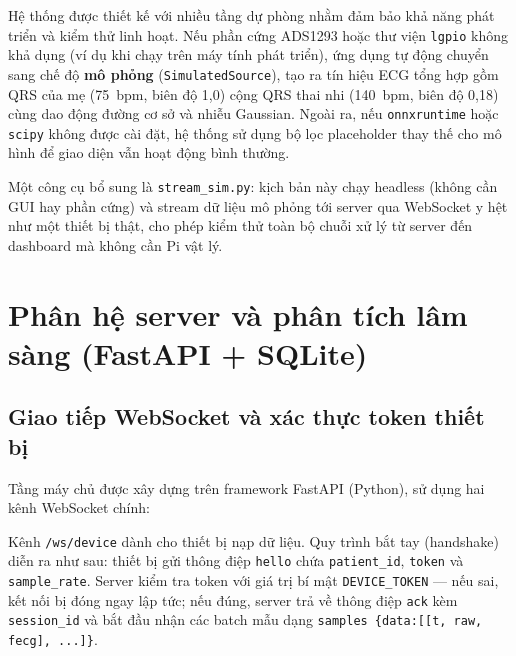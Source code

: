 \documentclass[../DoAn.tex]{subfiles}
\begin{document}
Hệ thống được thiết kế với nhiều tầng dự phòng nhằm đảm bảo khả năng phát triển và kiểm thử linh hoạt. Nếu phần cứng ADS1293 hoặc thư viện \texttt{lgpio} không khả dụng (ví dụ khi chạy trên máy tính phát triển), ứng dụng tự động chuyển sang chế độ \textbf{mô phỏng} (\texttt{SimulatedSource}), tạo ra tín hiệu ECG tổng hợp gồm QRS của mẹ (75~bpm, biên độ 1{,}0) cộng QRS thai nhi (140~bpm, biên độ 0{,}18) cùng dao động đường cơ sở và nhiễu Gaussian. Ngoài ra, nếu \texttt{onnxruntime} hoặc \texttt{scipy} không được cài đặt, hệ thống sử dụng bộ lọc placeholder thay thế cho mô hình để giao diện vẫn hoạt động bình thường.

Một công cụ bổ sung là \texttt{stream\_sim.py}: kịch bản này chạy headless (không cần GUI hay phần cứng) và stream dữ liệu mô phỏng tới server qua WebSocket y hệt như một thiết bị thật, cho phép kiểm thử toàn bộ chuỗi xử lý từ server đến dashboard mà không cần Pi vật lý.

\section{Phân hệ server và phân tích lâm sàng (FastAPI + SQLite)}

\subsection{Giao tiếp WebSocket và xác thực token thiết bị}

Tầng máy chủ được xây dựng trên framework FastAPI (Python), sử dụng hai kênh WebSocket chính:

Kênh \texttt{/ws/device} dành cho thiết bị nạp dữ liệu. Quy trình bắt tay (handshake) diễn ra như sau: thiết bị gửi thông điệp \texttt{hello} chứa \texttt{patient\_id}, \texttt{token} và \texttt{sample\_rate}. Server kiểm tra token với giá trị bí mật \texttt{DEVICE\_TOKEN} --- nếu sai, kết nối bị đóng ngay lập tức; nếu đúng, server trả về thông điệp \texttt{ack} kèm \texttt{session\_id} và bắt đầu nhận các batch mẫu dạng \texttt{samples \{data:[[t, raw, fecg], ...]\}}.
\end{document}

